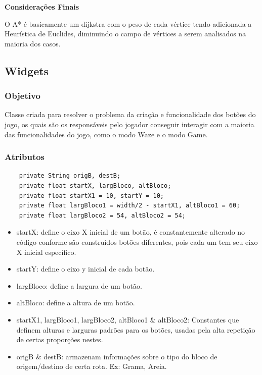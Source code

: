 \documentclass[
	12pt,				%
	oneside,			%
	a4paper,			%
	english,			%
	brazil,				%
	]{abntex2}
\begin{document}
{\textbf{Considerações Finais}

O A* é basicamente um dijkstra com o peso de cada vértice tendo adicionada a Heurística de Euclides, diminuindo o campo de vértices a serem analisados na maioria dos casos.

\subsection{Widgets}\label{sub:widgets} %

\subsubsection{Objetivo}

Classe criada para resolver o problema da criação e funcionalidade dos botões do jogo, os quais são os responsáveis pelo jogador conseguir interagir com a maioria das funcionalidades do jogo, como o modo Waze e o modo Game.

\subsubsection{Atributos}
\begin{lstlisting}
    private String origB, destB;
    private float startX, largBloco, altBloco;
    private float startX1 = 10, startY = 10;
    private float largBloco1 = width/2 - startX1, altBloco1 = 60;
    private float largBloco2 = 54, altBloco2 = 54;
\end{lstlisting}

\begin{itemize}
    \item startX: define o eixo X inicial de um botão, é constantemente alterado no código conforme são construídos botões diferentes, pois cada um tem seu eixo X inicial específico.
    \item startY: define o eixo y inicial de cada botão.
    \item largBloco: define a largura de um botão.
    \item altBloco: define a altura de um botão.
    \item startX1, largBloco1, largBloco2, altBloco1 & altBloco2: Constantes que definem alturas e larguras padrões para os botões, usadas pela alta repetição de certas proporções nestes.
    \item origB & destB: armazenam informações sobre o tipo do bloco de origem/destino de certa rota. Ex: Grama, Areia.
\end{itemize}

}
\end{document}
